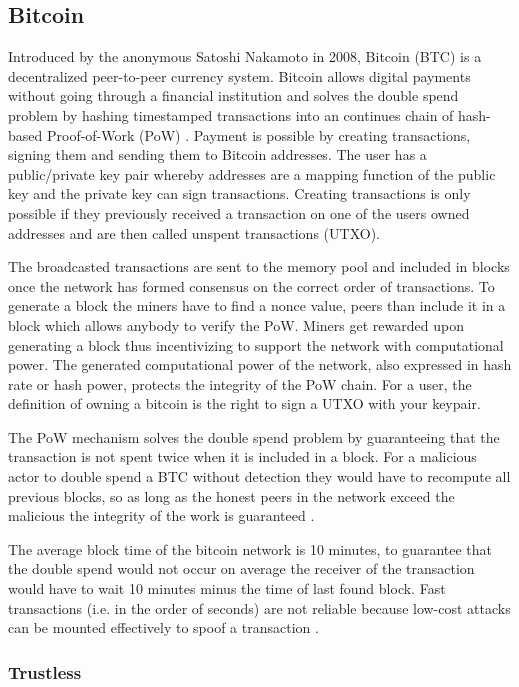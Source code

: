 \subsection{Bitcoin}

Introduced by the anonymous Satoshi Nakamoto in 2008, Bitcoin (BTC) is a decentralized peer-to-peer currency system. Bitcoin allows digital payments without going through a financial institution and solves the double spend problem by hashing timestamped transactions into an continues chain of hash-based Proof-of-Work (PoW) \cite{nakamoto2008bitcoin}. Payment is possible by creating transactions, signing them and sending them to Bitcoin addresses. The user has a public/private key pair whereby addresses are a mapping function of the public key and the private key can sign transactions. Creating transactions is only possible if they previously received a transaction on one of the users owned addresses and are then called unspent transactions (UTXO).\par
The broadcasted transactions are sent to the memory pool and included in blocks once the network has formed consensus on the correct order of transactions. To generate a block the miners have to find a nonce value, peers than include it in a block which allows anybody to verify the PoW. Miners get rewarded upon generating a block thus incentivizing to support the network with computational power. The generated computational power of the network, also expressed in hash rate or hash power, protects the integrity of the PoW chain. For a user, the definition of owning a bitcoin is the right to sign a UTXO with your keypair.\par
The PoW mechanism solves the double spend problem by guaranteeing that the transaction is not spent twice when it is included in a block. For a malicious actor to double spend a BTC without detection they would have to recompute all previous blocks, so as long as the honest peers in the network exceed the malicious the integrity of the work is guaranteed \cite{nakamoto2008bitcoin}. \par
The average block time of the bitcoin network is 10 minutes, to guarantee that the double spend would not occur on average the receiver of the transaction would have to wait 10 minutes minus the time of last found block. Fast transactions (i.e. in the order of seconds) are not reliable because low-cost attacks can be mounted effectively to spoof a transaction \cite{karame2012two}.

\subsubsection{Trustless}

